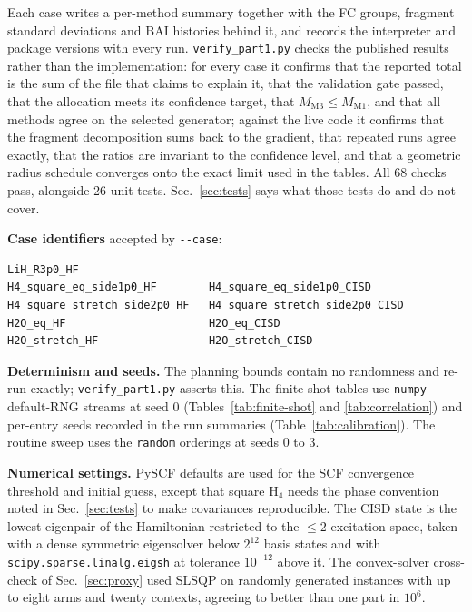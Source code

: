 \documentclass[10pt]{article}
\begin{document}
Each case writes a per-method summary together with the FC groups, fragment standard deviations and BAI histories behind it, and records the interpreter and package versions with every run. \texttt{verify\_part1.py} checks the published results rather than the implementation: for every case it confirms that the reported total is the sum of the file that claims to explain it, that the validation gate passed, that the allocation meets its confidence target, that $M_{\mathrm{M3}}\le M_{\mathrm{M1}}$, and that all methods agree on the selected generator; against the live code it confirms that the fragment decomposition sums back to the gradient, that repeated runs agree exactly, that the ratios are invariant to the confidence level, and that a geometric radius schedule converges onto the exact limit used in the tables. All 68 checks pass, alongside 26 unit tests. Sec.~\ref{sec:tests} says what those tests do and do not cover.

\textbf{Case identifiers} accepted by \texttt{-{}-case}:
\begin{verbatim}
LiH_R3p0_HF
H4_square_eq_side1p0_HF        H4_square_eq_side1p0_CISD
H4_square_stretch_side2p0_HF   H4_square_stretch_side2p0_CISD
H2O_eq_HF                      H2O_eq_CISD
H2O_stretch_HF                 H2O_stretch_CISD
\end{verbatim}

\textbf{Determinism and seeds.} The planning bounds contain no randomness and re-run exactly; \texttt{verify\_part1.py} asserts this. The finite-shot tables use \texttt{numpy} default-RNG streams at seed $0$ (Tables~\ref{tab:finite-shot} and \ref{tab:correlation}) and per-entry seeds recorded in the run summaries (Table~\ref{tab:calibration}). The routine sweep uses the \texttt{random} orderings at seeds $0$ to $3$.

\textbf{Numerical settings.} PySCF defaults are used for the SCF convergence
threshold and initial guess, except that square H$_4$ needs the phase convention
noted in Sec.~\ref{sec:tests} to make covariances reproducible. The CISD state is
the lowest eigenpair of the Hamiltonian restricted to the $\le2$-excitation space,
taken with a dense symmetric eigensolver below $2^{12}$ basis states and with
\texttt{scipy.sparse.linalg.eigsh} at tolerance $10^{-12}$ above it. The
convex-solver cross-check of Sec.~\ref{sec:proxy} used SLSQP on randomly generated
instances with up to eight arms and twenty contexts, agreeing to better than one
part in $10^{6}$.
\end{document}

